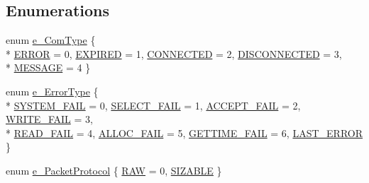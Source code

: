 \subsection*{Enumerations}
\begin{DoxyCompactItemize}
\item 
enum \hyperlink{namespacebpt_1_1_net_com_af9a32b3ed140e0524b0ed8d7b98afe31}{e\-\_\-\-Com\-Type} \{ \\*
\hyperlink{namespacebpt_1_1_net_com_af9a32b3ed140e0524b0ed8d7b98afe31a269210a0d4acfd8f825c60bbd2ec3a62}{E\-R\-R\-O\-R} = 0, 
\hyperlink{namespacebpt_1_1_net_com_af9a32b3ed140e0524b0ed8d7b98afe31a92ea68e7bc7aa7bb037fffd8a0595b91}{E\-X\-P\-I\-R\-E\-D} = 1, 
\hyperlink{namespacebpt_1_1_net_com_af9a32b3ed140e0524b0ed8d7b98afe31a6463c31d628b29172c9d86f7442ae29c}{C\-O\-N\-N\-E\-C\-T\-E\-D} = 2, 
\hyperlink{namespacebpt_1_1_net_com_af9a32b3ed140e0524b0ed8d7b98afe31ac57d396ca3c12033d3be4fc36fb9fde2}{D\-I\-S\-C\-O\-N\-N\-E\-C\-T\-E\-D} = 3, 
\\*
\hyperlink{namespacebpt_1_1_net_com_af9a32b3ed140e0524b0ed8d7b98afe31a2cbb16adbb48ac4113e36971522fe2d0}{M\-E\-S\-S\-A\-G\-E} = 4
 \}
\item 
enum \hyperlink{namespacebpt_1_1_net_com_a5170d932195b5bf312c95a063bcf97f7}{e\-\_\-\-Error\-Type} \{ \\*
\hyperlink{namespacebpt_1_1_net_com_a5170d932195b5bf312c95a063bcf97f7a845acd182601bcbb4527a7f3fe46238b}{S\-Y\-S\-T\-E\-M\-\_\-\-F\-A\-I\-L} = 0, 
\hyperlink{namespacebpt_1_1_net_com_a5170d932195b5bf312c95a063bcf97f7a672abd41dc94b8e12cbba9c4e73286f3}{S\-E\-L\-E\-C\-T\-\_\-\-F\-A\-I\-L} = 1, 
\hyperlink{namespacebpt_1_1_net_com_a5170d932195b5bf312c95a063bcf97f7a6f43cdc1e39c4a46a2d885c833ef3dde}{A\-C\-C\-E\-P\-T\-\_\-\-F\-A\-I\-L} = 2, 
\hyperlink{namespacebpt_1_1_net_com_a5170d932195b5bf312c95a063bcf97f7a3d7c2cdcd9de6ca3306a53752a228d5e}{W\-R\-I\-T\-E\-\_\-\-F\-A\-I\-L} = 3, 
\\*
\hyperlink{namespacebpt_1_1_net_com_a5170d932195b5bf312c95a063bcf97f7a9c0f88a90cda3cd5bc5ebb07229b7842}{R\-E\-A\-D\-\_\-\-F\-A\-I\-L} = 4, 
\hyperlink{namespacebpt_1_1_net_com_a5170d932195b5bf312c95a063bcf97f7af7ab5da6ee311ad459904e43d1e422cf}{A\-L\-L\-O\-C\-\_\-\-F\-A\-I\-L} = 5, 
\hyperlink{namespacebpt_1_1_net_com_a5170d932195b5bf312c95a063bcf97f7ae7aa9609abd1f153fdbb58901e35b244}{G\-E\-T\-T\-I\-M\-E\-\_\-\-F\-A\-I\-L} = 6, 
\hyperlink{namespacebpt_1_1_net_com_a5170d932195b5bf312c95a063bcf97f7aeebf99d1762992f440ba92606928f088}{L\-A\-S\-T\-\_\-\-E\-R\-R\-O\-R}
 \}
\item 
enum \hyperlink{namespacebpt_1_1_net_com_a9fe17665f9f84a23e9f941d317acdd5e}{e\-\_\-\-Packet\-Protocol} \{ \hyperlink{namespacebpt_1_1_net_com_a9fe17665f9f84a23e9f941d317acdd5eac65611a5a37f6a29b9d9eb5165a36122}{R\-A\-W} = 0, 
\hyperlink{namespacebpt_1_1_net_com_a9fe17665f9f84a23e9f941d317acdd5ea3a21f6df1ad6b471149132219220c7fa}{S\-I\-Z\-A\-B\-L\-E}
 \}
\end{DoxyCompactItemize}
